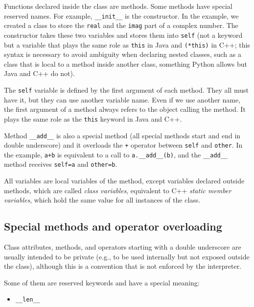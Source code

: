 \documentclass[justified,sixbynine]{tufte-book}
\def\ft{\small\tt}
\theoremstyle{plain}%
\theoremstyle{definition}
\theoremstyle{remark}
\begin{document}
\begin{fullwidth}
Functions declared inside the class are methods. Some methods have special reserved names. For example, {\ft \_\_init\_\_} is the constructor. In the example, we created a class to store the {\ft real} and the {\ft imag} part of a complex number. The constructor takes these two variables and stores them into {\ft self} (not a keyword but a variable that plays the same role as {\ft this} in Java and {\ft (*this)} in C++;
this syntax is necessary to avoid ambiguity when declaring nested classes, such as a class that is local to a method inside another class, something Python allows but Java and C++ do not).

The {\ft self} variable is defined by the first argument of each method. They all must have it, but they can use another variable name. Even if we use another name, the first argument of a method always refers to the object calling the method. It plays the same role as the {\ft this} keyword in Java and C++.

Method {\ft \_\_add\_\_} is also a special method (all special methods start and end in double underscore) and it overloads the {\ft +} operator between {\ft self} and {\ft other}. In the example, {\ft a+b} is equivalent to a call to {\ft a.\_\_add\_\_(b)}, and the {\ft \_\_add\_\_} method receives {\ft self=a} and {\ft other=b}.

All variables are local variables of the method, except variables declared outside methods, which are called {\it class variables}, equivalent to C++ {\it static member variables}, which hold the same value for all instances of the class.

\goodbreak\subsection{Special methods and operator overloading}




Class attributes, methods, and operators starting with a double underscore are usually intended to be private (e.g., to be used internally but not exposed outside the class), although this is a convention that is not enforced by the interpreter.

Some of them are reserved keywords and have a special meaning:
\begin{itemize}
\item {\ft \_\_len\_\_}


\end{itemize}
\end{fullwidth}
\end{document}
